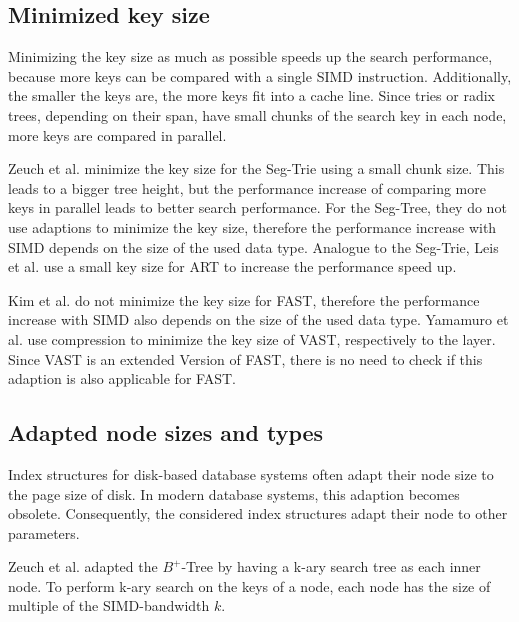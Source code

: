 \documentclass[conference]{IEEEtran}
\begin{document}
\subsection{Minimized key size}
Minimizing the key size as much as possible speeds up the search performance, because more keys can be compared with a single SIMD instruction. Additionally, the smaller the keys are, the more keys fit into a cache line. Since tries or radix trees, depending on their span, have small chunks of the search key in each node, more keys are compared in parallel.

Zeuch et al. minimize the key size for the Seg-Trie using a small chunk size. This leads to a bigger tree height, but the performance increase of comparing more keys in parallel leads to better search performance. For the Seg-Tree, they do not use adaptions to minimize the key size, therefore the performance increase with SIMD depends on the size of the used data type. Analogue to the Seg-Trie, Leis et al. use a small key size for ART to increase the performance speed up.

Kim et al. do not minimize the key size for FAST, therefore the performance increase with SIMD also depends on the size of the used data type. Yamamuro et al. use compression to minimize the key size of VAST, respectively to the layer. Since VAST is an extended Version of FAST, there is no need to check if this adaption is also applicable for FAST. 


\subsection{Adapted node sizes and types}
Index structures for disk-based database systems often adapt their node size to the page size of disk. In modern database systems, this adaption becomes obsolete. Consequently, the considered index structures adapt their node to other parameters. 

Zeuch et al. adapted the $B^+$-Tree by having a k-ary search tree as each inner node. To perform k-ary search on the keys of a node, each node has the size of multiple of the SIMD-bandwidth $k$.
\end{document}

